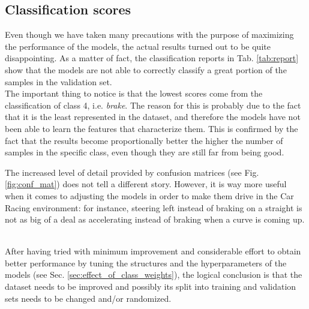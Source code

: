 \subsection{Classification scores}
\label{sec:classification_scores}
Even though we have taken many precautions with the purpose of maximizing the performance of the models, the actual results turned out to be quite disappointing. As a matter of fact, the classification reports in Tab. \ref{tab:report} show that the models are not able to correctly classify a great portion of the samples in the validation set.
\\The important thing to notice is that the lowest scores come from the classification of class 4, i.e. \textit{brake}. The reason for this is probably due to the fact that it is the least represented in the dataset, and therefore the models have not been able to learn the features that characterize them. This is confirmed by the fact that the results become proportionally better the higher the number of samples in the specific class, even though they are still far from being good.



\noindent The increased level of detail provided by confusion matrices (see Fig. \ref{fig:conf_mat}) does not tell a different story. However, it is way more useful when it comes to adjusting the models in order to make them drive in the Car Racing environment: for instance, steering left instead of braking on a straight is not as big of a deal as accelerating instead of braking when a curve is coming up.



\noindent \\After having tried with minimum improvement and considerable effort to obtain better performance by tuning the structures and the hyperparameters of the models (see Sec. \ref{sec:effect_of_class_weights}), the logical conclusion is that the dataset needs to be improved and possibly its split into training and validation sets needs to be changed and/or randomized.



